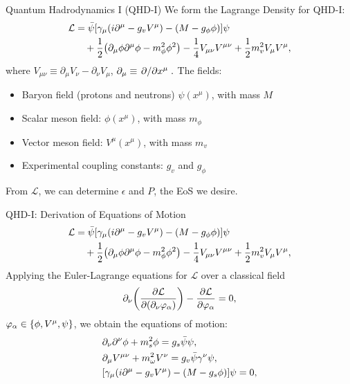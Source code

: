 \documentclass[handout]{beamer}
\newcommand{\Letter}[1]{\mathcal{#1}}
\newcommand{\Lag}{\Letter{L}}
\newcommand{\Def}{\equiv}
\newcommand{\p}{\partial}
\begin{document}
    \begin{frame}{Quantum Hadrodynamics I (QHD-I)}
        We form the Lagrange Density for QHD-I: \pause
        \begin{align*}
            \Lag & = \bar{\psi} \bqty{\gamma_\mu(i\p^\mu -g_v V^\mu) - (M-g_\phi\phi)} \psi \nonumber\\
            & \quad + \frac{1}{2} \pqty{\p_\mu \phi \p^\mu \phi - m_\phi^2 \phi^2} - \frac{1}{4} V_{\mu\nu}V^{\mu\nu} + \frac{1}{2} m_v^2 V_\mu V^\mu,
        \end{align*}\pause
        where $V_{\mu\nu}\Def\p_\mu V_\nu - \p_\nu V_\mu$, $\p_\mu \Def \pdv*{x^\mu}.$ The fields:
        \begin{itemize}
            \item Baryon field (protons and neutrons) $\psi(x^\mu)$, with mass $M$ \pause
            \item Scalar meson field: $\phi(x^\mu)$, with mass $m_\phi$
            \item Vector meson field: $V^\mu(x^\mu)$, with mass $m_v$
            \item Experimental coupling constants: $g_v$ and $g_\phi$ \pause
        \end{itemize}
        From $\Lag$, we can determine $\epsilon$ and $P$, the EoS we desire.
    \end{frame}

    \begin{frame}{QHD-I: Derivation of Equations of Motion}
        \begin{align*}
            \Lag & = \bar{\psi} \bqty{\gamma_\mu(i\p^\mu -g_v V^\mu) - (M-g_\phi\phi)} \psi \nonumber\\
            & \quad + \frac{1}{2} \pqty{\p_\mu \phi \p^\mu \phi - m_\phi^2 \phi^2} - \frac{1}{4} V_{\mu\nu}V^{\mu\nu} + \frac{1}{2} m_v^2 V_\mu V^\mu,
        \end{align*}\pause
        Applying the Euler-Lagrange equations for $\Lag$ over a classical field
        \[\p_\nu\qty(\pdv{\Lag}{(\p_\nu \varphi_\alpha)}) - \pdv{\Lag}{\varphi_\alpha} = 0,\]
        $\varphi_\alpha \in \Bqty{\phi, V^\mu, \psi}$, we obtain the equations of motion:
        \begin{align*}
            &\p_\nu \p^\nu \phi + m_s^2\phi = g_s\bar{\psi}\psi,\\
            &\p_\mu V^{\mu\nu} + m_\omega^2 V^\nu = g_v \bar\psi \gamma^\nu \psi,\\
            &\bqty{\gamma_\mu(i\p^\mu -g_v V^\mu) - (M-g_s\phi)} \psi = 0,\\
        \end{align*}
    \end{frame}
\end{document}
